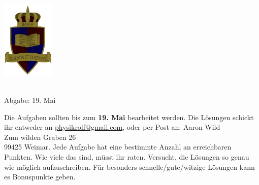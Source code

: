 \documentclass[a4paper]{article}
\begin{document}
	\vspace*{-2cm}
	\parbox{4cm}{\includegraphics[width=2.5cm]{../images/ROLF4.png}}
	\parbox{10.6cm}{ \\ Abgabe: 19. Mai \\ \vspace*{-.5cm} }
	
	

\thispagestyle{empty}
\begin{framed}
	\noindent
	\scriptsize
	Die Aufgaben sollten bis zum \textbf{19. Mai} bearbeitet werden. Die Lösungen schickt ihr entweder an \href{mailto:physikrolf@gmail.com}{physikrolf@gmail.com}, oder per Post an: 
	Aaron Wild\\Zum wilden Graben 26\\99425 Weimar.
	Jede Aufgabe hat eine bestimmte Anzahl an erreichbaren Punkten. Wie viele das sind, müsst ihr raten. Versucht, die Lösungen so genau wie möglich aufzuschreiben. Für besonders schnelle/gute/witzige Lösungen kann es Bonuspunkte geben.

\end{framed}

\noindent




\end{document}
